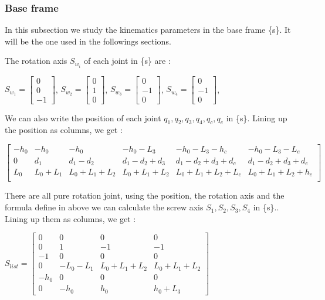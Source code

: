 \subsubsection{Base frame}

In this subsection we study the kinematics parameters in the base frame \{s\}. It will be the one used in the followings sections.

\bigbreak
The rotation axis $S_{w_i}$ of each joint  in \{s\} are : 
\begin{center}
    $S_{w_1} = \begin{bmatrix} 0 \\ 0 \\ -1\end{bmatrix}$,
    $S_{w_2} = \begin{bmatrix} 0 \\ 1 \\ 0\end{bmatrix}$,
    $S_{w_3} = \begin{bmatrix} 0 \\ -1 \\ 0\end{bmatrix}$,
    $S_{w_4} = \begin{bmatrix} 0 \\ -1 \\ 0\end{bmatrix}$,
\end{center}

\bigbreak
We can also write the position of each joint  $q_1,q_2,q_3,q_4,q_c,q_e$ in \{s\}. Lining up the position as columns, we get : 

\begin{center}
    $
    \begin{bmatrix}
        -h_0 & -h_0 & -h_0 & -h_0-L_3 & -h_0-L_3-h_c & -h_0-L_3-L_e  \\
        0 & d_1 & d_1-d_2 & d_1-d_2+d_3 & d_1-d_2+d_3+d_c & d_1-d_2+d_3+d_e \\
        L_0 & L_0+L_1 & L_0+L_1+L_2 & L_0+L_1+L_2 & L_0+L_1+L_2+L_c & L_0+L_1+L_2+h_e \\
    \end{bmatrix}
    $
\end{center}

\bigbreak
There are all pure rotation joint, using the position, the rotation axis and the formula define in above we can calculate the screw axis $S_1,S_2,S_3,S_4$ in \{s\}.. Lining up them as columns, we get : 

\begin{center}
    $S_{list} = 
    \begin{bmatrix}
        0 & 0 & 0 & 0 \\
        0 & 1 & -1 & -1 \\
        -1 & 0 & 0 & 0 \\
        0 & -L_0-L_1 & L_0+L_1+L_2 & L_0+L_1+L_2 \\
        -h_0 & 0 & 0 & 0 \\
        0 & -h_0 & h_0 & h_0+L_3
    \end{bmatrix}
    $
\end{center}


